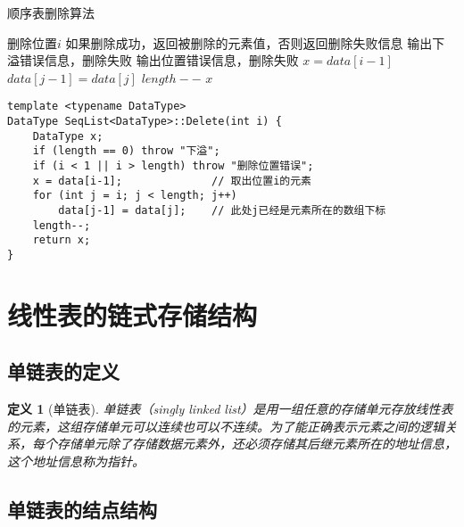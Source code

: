 \documentclass[12pt,a4paper]{amsart}
\newtheorem{definition}{定义}[section]
\begin{document}
\begin{algorithm}[H]
\caption{顺序表删除算法}
\begin{algorithmic}[1]
\REQUIRE 删除位置$i$
\ENSURE 如果删除成功，返回被删除的元素值，否则返回删除失败信息
    \STATE 输出下溢错误信息，删除失败
\ENDIF
{}
    \STATE 输出位置错误信息，删除失败
\ENDIF
\STATE $x = data[i-1]$ 
    \STATE $data[j-1] = data[j]$ 
\ENDFOR
\STATE $length--$ 
\RETURN $x$
\end{algorithmic}
\end{algorithm}

\begin{lstlisting}[caption=顺序表删除操作实现]
template <typename DataType>
DataType SeqList<DataType>::Delete(int i) {
    DataType x;
    if (length == 0) throw "下溢";
    if (i < 1 || i > length) throw "删除位置错误";
    x = data[i-1];              // 取出位置i的元素
    for (int j = i; j < length; j++)
        data[j-1] = data[j];    // 此处j已经是元素所在的数组下标
    length--;
    return x;
}
\end{lstlisting}

\section{线性表的链式存储结构}

\subsection{单链表的定义}

\begin{definition}[单链表]
单链表（singly linked list）是用一组任意的存储单元存放线性表的元素，这组存储单元可以连续也可以不连续。为了能正确表示元素之间的逻辑关系，每个存储单元除了存储数据元素外，还必须存储其后继元素所在的地址信息，这个地址信息称为指针。
\end{definition}

\subsection{单链表的结点结构}

\begin{center}
\end{center}
\end{document}
